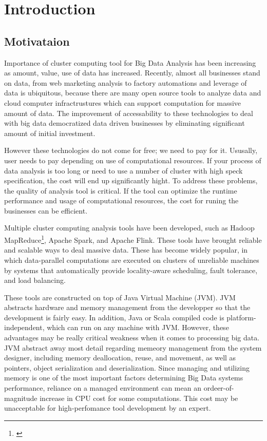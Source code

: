 \chapter{Introduction}
\label{chapter:Introduction}
\thispagestyle{myheadings}


\section{Motivataion}
\label{sec:history}
Importance of cluster computing tool for Big Data Analysis has been increasing as amount, value, use of data has increased. 
Recently, almost all businesses stand on data, from web marketing analysis to factory automations and leverage of data is ubiquitous, because 
there are many open source tools to analyze data and cloud computer infractrustures which can support computation for massive amount of data. 
The improvement of accessability to these technologies to deal with big data democratized data driven businesses by 
eliminating significant amount of initial investment. 

However these technologies do not come for free; we need to pay for it. Ususally, user needs to pay depending on use of computational resources. 
If your process of data analysis is too long or need to use a number of cluster with high speck specification, the cost will end up significantly hight.
To address these problems, the quality of analysis tool is critical. If the tool can optimize the runtime performance and usage of computational resources, 
the cost for runing the businesses can be efficient.

Multiple cluster computing analysis tools have been developed, such as Hadoop MapReduce\footnote{\cite{ApacheHadoopHomePage}}, Apache Spark, and Apache Flink. These tools have brought reliable and scalable ways to deal massive data. 
These has become widely popular, in which data-parallel computations are executed on clusters of unreliable machines by systems that automatically provide locality-aware scheduling, 
fault tolerance, and load balancing. 

These tools are constructed on top of Java Virtual Machine (JVM). JVM abstracts hardware and memory management from the developper so that the development is fairly easy. 
In addition, Java or Scala compiled code is platform-independent, which can run on any machine with JVM. However, these advantages may be really critical weakness when it comes to 
processing big data. JVM abstract away most detail regarding memeory management from the system designer, including memory deallocation, reuse, and movement, as well as pointers, 
object serialization and deserialization. Since managing and utilizing memory is one of the most important factors determining Big Data systems performance, 
reliance on a managed environment can mean an ordeer-of-magnitude increase in CPU cost for some computations. This cost may be unacceptable for high-perfomance tool development by an expert.

